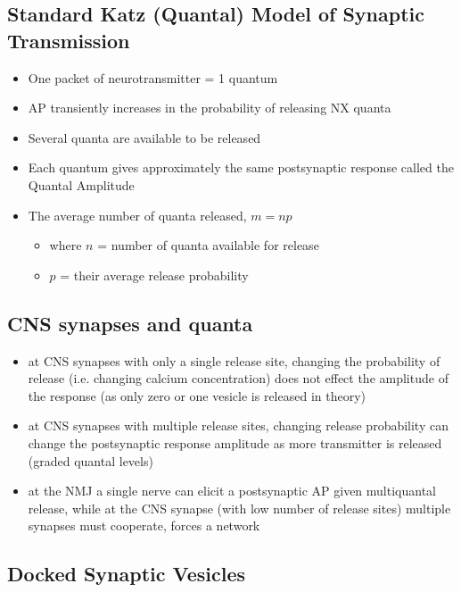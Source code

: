 \documentclass{article}
\begin{document}
\subsection*{Standard Katz (Quantal) Model of Synaptic Transmission}

\begin{itemize}
    \item One packet of neurotransmitter = 1 quantum
    \item AP transiently increases in the probability of releasing NX quanta
    \item Several quanta are available to be released
    \item Each quantum gives approximately the same postsynaptic response called the Quantal Amplitude
    \item The average number of quanta released, $m = np$
      \begin{itemize}
        \item where $n$ = number of quanta available for release
        \item $p$ = their average release probability
      \end{itemize}
\end{itemize}

\subsection*{CNS synapses and quanta}

\begin{itemize}
    \item at CNS synapses with only a single release site, changing the probability of release (i.e. changing calcium concentration) does not effect the amplitude of the response (as only zero or one vesicle is released in theory)
    \item at CNS synapses with multiple release sites, changing release probability can change the postsynaptic response amplitude as more transmitter is released (graded quantal levels)
    \item at the NMJ a single nerve can elicit a postsynaptic AP given multiquantal release, while at the CNS synapse (with low number of release sites) multiple synapses must cooperate, forces a network
\end{itemize}

\subsection*{Docked Synaptic Vesicles}
\end{document}
